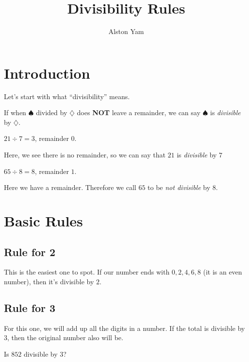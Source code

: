 \documentclass{article}
\title{Divisibility Rules}
\author{Alston Yam}
\date{}
\theoremstyle{mytheoremstyle}
\theoremstyle{mytheoremstyle}
\theoremstyle{myproblemstyle}
\theoremstyle{myproblemstyle}
\begin{document}
    \maketitle

        \section*{Introduction}
        Let's start with what ``divisibility'' means.

        \begin{definition}[Divisibility]
            If when $\spadesuit$ divided by $\diamondsuit$ does \textbf{NOT} leave a remainder, we can say $\spadesuit$ is \textit{divisible} by $\diamondsuit$.
        \end{definition}

        \begin{example}[divisible]
            $21 \div 7 = 3$, remainder $0$.
        \end{example}
        Here, we see there is no remainder, so we can say that $21$ is \textit{divisible} by $7$

        \begin{example}
            $65 \div 8 = 8$, remainder $1$.
        \end{example}
        Here we have a remainder. Therefore we call $65$ to be \textit{not divisible} by $8$.

        \section{Basic Rules}

        \subsection{Rule for 2}
        This is the easiest one to spot. If our number ends with $0, 2, 4, 6, 8$ (it is an even number), then it's divisible by $2$.

        \subsection{Rule for 3}
        For this one, we will add up all the digits in a number. If the total is divisible by $3$, then the original number also will be.

        \begin{example}
            Is $852$ divisible by $3$?
        \end{example}
\end{document}
